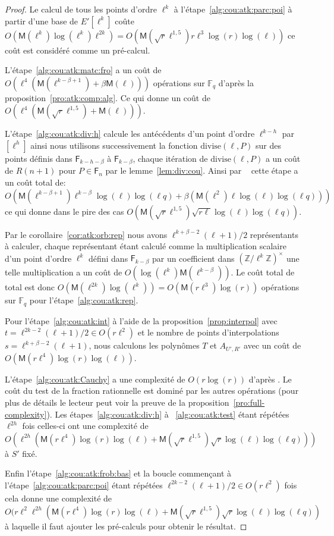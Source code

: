 \documentclass[10pt,a4paper]{book}
\theoremstyle{plain}
\theoremstyle{definition}
\theoremstyle{definition}
\theoremstyle{definition}
\theoremstyle{definition}
\theoremstyle{definition}
\theoremstyle{remark}
\theoremstyle{remark}
\theoremstyle{definition}
\begin{document}
\begin{proof}
Le calcul de tous les points d'ordre $\ell^k$ à 
l'étape~\ref{alg:cou:atk:parc:poi} à partir d'une base de $E'[\ell^k]$ coûte 
$O(\mathsf{M}(\ell^k)\log(\ell^k)\ell^{2k})=
O(\mathsf{M}(\sqrt{r}\ell^{1,5})r\ell^3\log(r)\log(\ell))$ ce coût est considéré comme 
un pré-calcul.

L'étape~\ref{alg:cou:atk:matc:fro} a un coût de 
$O(\ell^4(\mathsf{M}(\ell^{k-\beta+1})+\beta\mathsf{M}(\ell)))$
opérations sur $\mathbb{F}_q$ d'après la proposition~\ref{pro:atk:comp:alg}.
Ce qui donne un coût de $O(\ell^4(\mathsf{M}(\sqrt{r}\ell^{1,5})+\mathsf{M}(\ell)))$.

L'étape~\ref{alg:cou:atk:div:h} calcule les antécédents d'un point d'ordre
$\ell^{k-h}$ par $[\ell^h]$ ainsi nous utilisons successivement la fonction 
$\mathrm{divise}(\ell,P)$ sur des points définis dans $\mathsf{F}_{k-h-\beta}$ à
$\mathsf{F}_{k-\beta}$, chaque itération de $\mathrm{divise}(\ell,P)$ a un coût
de $R(n+1)$ pour $P \in \mathsf{F}_n$ par le lemme~\ref{lem:div:cou}. Ainsi 
par ~\cite[Chapter~14.5]{vzGJG03} cette étape a un coût total de: 
$O(\mathsf{M}(\ell^{k-\beta +1})\ell^{k-\beta}\log(\ell)\log(\ell q)+\beta (\mathsf{M}(\ell^2)\ell\log(\ell)\log(\ell q)))$ 
ce qui donne dans le pire des cas
$O(\mathsf{M}(\sqrt{r}\ell^{1,5})\sqrt{r\ell}\log(\ell)\log(\ell q))$.

Par le corollaire~\ref{cor:atk:orb:rep} nous avons $\ell^{k+\beta-2}(\ell+1)/2$ 
représentants à calculer, chaque représentant étant 
calculé comme la multiplication scalaire d'un point d'ordre $\ell^k$ défini 
dans $\mathsf{F}_{k-\beta}$ par un coefficient dans 
$(\mathbb{Z}/\ell^k\mathbb{Z})^{\times}$ une telle multiplication a un coût
de $O(\log(\ell^k)\mathsf{M}(\ell^{k-\beta}))$. Le coût total de total est donc
$O(\mathsf{M}(\ell^{2k})\log(\ell^k))=O(\mathsf{M}(r\ell^3)\log(r))$ opérations sur 
$\mathbb{F}_q$ pour l'étape~\ref{alg:cou:atk:rep}.

Pour l'étape~\ref{alg:cou:atk:int} à l'aide de la 
proposition~\ref{prop:interpol} avec $t=\ell^{2k-2}(\ell+1)/2 \in O(r\ell^2)$ 
et le nombre de points d'interpolations $s=\ell^{k+\beta-2}(\ell+1)$, nous 
calculons les polynômes $T$ et $A_{U',R'}$ avec un coût de 
$O(\mathsf{M}(r\ell^4)\log(r)\log(\ell))$. 

L'étape~\ref{alg:cou:atk:Cauchy} a une complexité de $O(r\log(r))$ d'après
\cite[Théorème 7.5]{algeff17}. Le coût du test de la fraction rationnelle est
dominé par les autres opérations (pour plus de détails le lecteur peut voir 
la preuve de la proposition~\ref{pro:full-complexity}).
\sloppy
Les étapes~\ref{alg:cou:atk:div:h} à ~\ref{alg:cou:atk:test} étant répétées 
$\ell^{2h}$ fois celles-ci ont une complexité de 
$O(\ell^{2h}(\mathsf{M}(r\ell^4)\log(r)\log(\ell)+\mathsf{M}(\sqrt{r}\ell^{1,5})\sqrt{r}\log(\ell)\log(\ell q)))$ 
à $S'$ fixé.
\fussy


Enfin l'étape~\ref{alg:cou:atk:frob:bas} et la boucle commençant à 
l'étape~\ref{alg:cou:atk:parc:poi} étant répétées $\ell^{2k-2}(\ell+1)/2 \in 
O(r\ell^2)$ fois cela donne une complexité de $O(r \ell^2 \ell^{2h}(\mathsf{M}(r\ell^4)\log(r)\log(\ell)+\mathsf{M}(\sqrt{r}\ell^{1,5})\sqrt{r}\log(\ell)\log(\ell q))$ à laquelle il faut ajouter les pré-calculs pour obtenir le résultat.
\end{proof}
\end{document}
